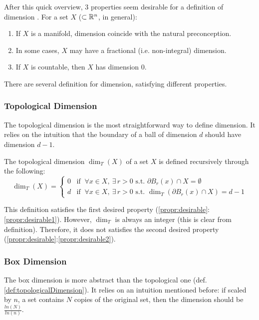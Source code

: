 After this quick overview, 3 properties seem desirable for a definition of dimension \cite{Pollicott_LFDT}.
For a set $X$ ($\subset \mathbb{R}^n$, in general):
\begin{enumerate}\label{propr:desirable}
	\item If $X$ is a manifold, dimension coincide with the natural preconception. \label{propr:desirable1}
	\item In some cases, $X$ may have a fractional (i.e. non-integral) dimension. \label{propr:desirable2}
	\item If $X$ is countable, then $X$ has dimension $0$. \label{propr:desirable3}
\end{enumerate}
There are several definition for dimension, satisfying different properties.

\subsubsection{Topological Dimension}
The topological dimension is the most straightforward way to define dimension.
It relies on the intuition that the boundary of a ball of dimension $d$ should have dimension $d-1$.

\begin{definition}\label{def:topologicalDimension}
	The topological dimension $\dim_T(X)$ of a set $X$ is defined recursively through the following:
	\begin{equation*}
		\dim_T(X) =
		\begin{cases}
			0 & \text{if } \ \forall x \in X, \ \exists \, r>0 \text{ s.t. } \partial B_r(x) \cap X = \emptyset\\
			d & \text{if } \ \forall x \in X, \ \exists \, r>0 \text{ s.t. } \dim_T(\partial B_r(x) \cap X) = d-1
		\end{cases}
	\end{equation*}
\end{definition}

This definition satisfies the first desired property (\ref{propr:desirable}:\ref{propr:desirable1}).
However, $\dim_T$ is always an integer (this is clear from definition).
Therefore, it does not satisfies the second desired property (\ref{propr:desirable}:\ref{propr:desirable2}).

\subsubsection{Box Dimension}
The box dimension is more abstract than the topological one (def. \ref{def:topologicalDimension}).
It relies on an intuition mentioned before: if scaled by $n$, a set contains $N$ copies of the original set, then the dimension should be  $\frac{ln(N)}{ln(n)}$.

